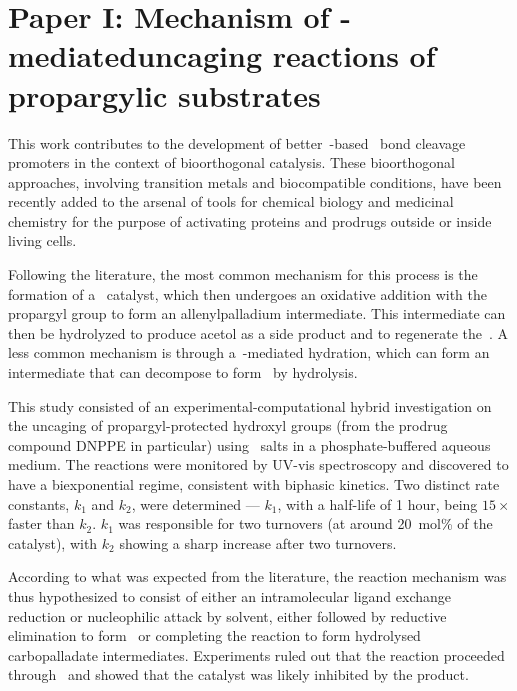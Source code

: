 \chapter{Paper I:\@
  Mechanism of -mediated\linebreak uncaging reactions %
  of propargylic substrates
 }%
\label{ch:paper1}

\begin{citacao}
\end{citacao}

This work contributes to the development of better~-based~ bond cleavage promoters in the context of bioorthogonal catalysis.
These bioorthogonal approaches,
involving transition metals and biocompatible conditions,
have been recently added to the arsenal of tools for chemical biology and medicinal chemistry for the purpose of activating proteins and prodrugs outside or inside living cells.

Following the literature,
the most common mechanism for this process is the formation of a~ catalyst,
which then undergoes an oxidative addition with the propargyl group to form an allenylpalladium intermediate.
This intermediate can then be hydrolyzed to produce acetol as a side product and to regenerate the~.
A less common mechanism is through a~-mediated hydration,
which can form an intermediate that can decompose to form~ by hydrolysis.

This study consisted of an experimental-computational hybrid investigation on the uncaging of propargyl-protected hydroxyl groups (from the prodrug compound DNPPE in particular) using~ salts in a phosphate-buffered aqueous medium.
The reactions were monitored by UV-vis spectroscopy and discovered to have a biexponential regime,
consistent with biphasic kinetics.
Two distinct rate constants,
$k_1$ and $k_2$,
were determined --- $k_1$,
with a half-life of 1 hour,
being $15 \times$ faster than $k_2$.
$k_1$ was responsible for two turnovers (at around 20~mol\% of the catalyst),
with $k_2$ showing a sharp increase after two turnovers.

According to what was expected from the literature,
the reaction mechanism was thus hypothesized to consist of either
an intramolecular ligand exchange reduction
or nucleophilic attack by solvent,
either followed by reductive elimination to form~
or completing the reaction to form hydrolysed carbopalladate intermediates.
Experiments ruled out that the reaction proceeded through~
and showed that the catalyst was likely inhibited by the product.

